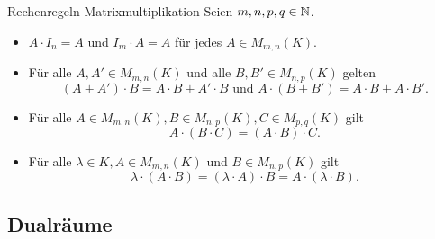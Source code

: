 \documentclass[main.tex]{subfiles}
\begin{document}
\begin{karte}{Rechenregeln Matrixmultiplikation}
    Seien \( m,n,p,q \in \mathbb{N} \).
    \begin{itemize}
        \item \( A \cdot I_n = A \) und \( I_m \cdot A = A \) 
        für jedes \( A \in M_{m,n}(K) \).
        \item Für alle \( A, A' \in M_{m,n}(K) \) und alle 
        \( B,B' \in M_{n,p}(K) \) gelten 
        \[ (A+A')\cdot B = A\cdot B + A' \cdot B \text{ und } 
        A \cdot (B + B') = A \cdot B + A \cdot B'. \]
        \item Für alle \( A \in M_{m,n}(K), B \in M_{n,p}(K), 
        C \in M_{p,q}(K) \) gilt 
        \[ A \cdot (B \cdot C) = (A \cdot B) \cdot C. \]
        \item Für alle \( \lambda \in K, A \in M_{m,n}(K) \) 
        und \( B \in M_{n,p}(K) \) gilt 
        \[ \lambda \cdot (A \cdot B) 
        = (\lambda \cdot A) \cdot B
        = A \cdot (\lambda \cdot B). \]
    \end{itemize}
\end{karte}
\subsection*{Dualräume} 
\end{document}
